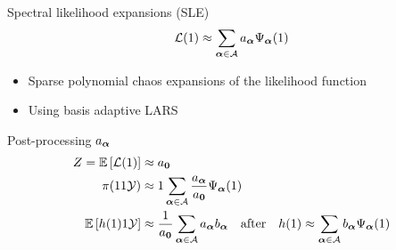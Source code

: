 \documentclass{rsuqbeamernew}
\newcommand{\BParams}{1}
\newcommand{\Bparams}{1}
\newcommand{\Bprior}{1}
\newcommand{\Bcond}{1}
\begin{document}
\begin{frame}[t]{Spectral likelihood expansions (SLE)}
	\small
	\begin{equation*}
	\cl(\BParams) \approx  
	\sum_{\ve{\alpha}\in\ca}
	a_{\ve{\alpha}}\Psi_{\ve{\alpha}}(\BParams)
	\end{equation*}
	
	\pause
	\begin{itemize}
		\itemsep0.5em
		\item {\altx  Sparse polynomial chaos expansions} of the
		likelihood function
		\item Using {\altx basis adaptive LARS}
	\end{itemize}
	\pause 
	\begin{block}{Post-processing $a_{\boldsymbol{\alpha}}$ \hfill
			}
		\begin{align*}
		Z = \Esp{\mathcal{L}(\BParams)}&\approx 
		a_{\ve{0}} \\ 
		\pi(\Bparams\Bcond\cy) &\approx 
		\Bprior\sum_{\ve{\alpha}\in\ca}
		\frac{a_{\ve{\alpha}}}{a_{\bf 0}} \Psi_{\ve{\alpha}}(\Bparams)\\
		\Esp{h(\BParams)\Bcond\cy} &\approx 
\frac{1}{a_{\ve{0}}}\sum_{\ve{\alpha}\in\ca}a_{\ve{\alpha}}b_{\ve{\alpha}}
		\quad \text{after} \quad h(\BParams)\approx 
		\sum_{\ve{\alpha}\in\ca}
		b_{\ve{\alpha}}\Psi_{\ve{\alpha}}(\BParams)
		\end{align*}
	\end{block}
\end{frame}
\end{document}
